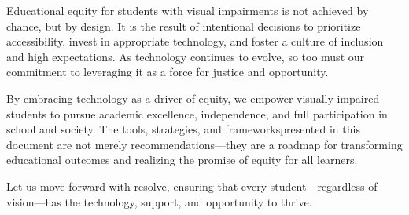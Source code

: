 Educational equity for students with visual impairments is not achieved by chance, but by design. It is the result of intentional decisions to prioritize accessibility, invest in appropriate technology, and foster a culture of inclusion and high expectations. As technology continues to evolve, so too must our commitment to leveraging it as a force for justice and opportunity.

By embracing technology as a driver of equity, we empower visually impaired students to pursue academic excellence, independence, and full participation in school and society. The tools, strategies, and frameworkspresented in this document are not merely recommendations—they are a roadmap for transforming educational outcomes and realizing the promise of equity for all learners.

Let us move forward with resolve, ensuring that every student—regardless of vision—has the technology, support, and opportunity to thrive.